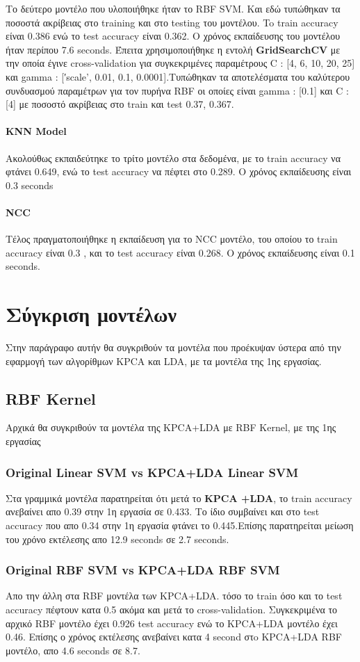 Το δεύτερο μοντέλο που υλοποιήθηκε ήταν το RBF SVM. Και εδώ τυπώθηκαν τα ποσοστά
ακρίβειας στο training και στο testing του μοντέλου. To train accuracy είναι 0.386 ενώ το test accuracy είναι 0.362. Ο χρόνος εκπαίδευσης του μοντέλου ήταν περίπου 7.6 seconds.
Έπειτα χρησιμοποιήθηκε η εντολή \textbf{GridSearchCV} με την οποία έγινε cross-validation για συγκεκριμένες παραμέτρους C : [4, 6, 10, 20, 25] και gamma : [′scale', 0.01, 0.1, 0.0001].Τυπώθηκαν τα αποτελέσματα του καλύτερου
συνδυασμού παραμέτρων για τον πυρήνα RBF οι οποίες είναι gamma : [0.1] και C :
[4] με ποσοστό ακρίβειας στο train και test 0.37, 0.367.

\paragraph{KNN Model}
Ακολούθως εκπαιδεύτηκε το τρίτο μοντέλο στα δεδομένα, με το train accuracy να φτάνει 0.649, ενώ το test accuracy να πέφτει στο 0.289. Ο χρόνος εκπαίδευσης είναι 0.3 seconds
\paragraph{NCC}
Τέλος πραγματοποιήθηκε η εκπαίδευση για το NCC μοντέλο, του οποίου το train accuracy είναι 0.3 , και το test accuracy είναι 0.268. Ο χρόνος εκπαίδευσης είναι 0.1 seconds.
\clearpage
\section{Σύγκριση μοντέλων}
Στην παράγραφο αυτήν θα συγκριθούν τα μοντέλα που προέκυψαν ύστερα από την εφαρμογή των αλγορίθμων KPCA και LDA, με τα μοντέλα της 1ης εργασίας.

\subsection{RBF Kernel}
Αρχικά θα συγκριθούν τα μοντέλα της KPCA+LDA με RBF Kernel, με της 1ης εργασίας
\subsubsection{Original Linear SVM vs KPCA+LDA Linear SVM}
Στα γραμμικά μοντέλα παρατηρείται ότι μετά το \textbf{KPCA +LDA}, το train accuracy ανεβαίνει απο 0.39 στην 1η εργασία σε 0.433. Το ίδιο συμβαίνει και στο test accuracy που απο 0.34 στην 1η εργασία φτάνει το 0.445.Επίσης παρατηρείται μείωση του χρόνο εκτέλεσης απο 12.9 seconds σε 2.7 seconds.
\subsubsection{Original RBF SVM vs KPCA+LDA RBF SVM}
Απο την άλλη στα RBF μοντέλα των KPCA+LDA. τόσο το train όσο και το test accuracy πέφτουν κατα 0.5 ακόμα και μετά το cross-validation. Συγκεκριμένα το αρχικό RBF μοντέλο έχει 0.926 test accuracy ενώ το KPCA+LDA μοντέλο έχει 0.46. Επίσης ο χρόνος εκτέλεσης ανεβαίνει κατα 4 second στo KPCA+LDA RBF μοντέλο, απο 4.6 seconds σε 8.7.
